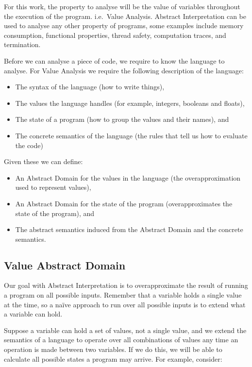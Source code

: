 For this work, the property to analyse will be the value of variables throughout the
execution of the program. i.e.~Value Analysis.  Abstract Interpretation can be used to
analyse any other property of programs, some examples include memory consumption,
functional properties, thread safety, computation traces, and termination.

Before we can analyse a piece of code, we require to know the language
to analyse. For Value Analysis we require the following description of
the language:

\begin{itemize}
\tightlist
\item
  The syntax of the language (how to write things),
\item
  The values the language handles (for example, integers, booleans and
  floats),
\item
  The state of a program (how to group the values and their names), and
\item
  The concrete semantics of the language (the rules that tell us how to
  evaluate the code)
\end{itemize}

Given these we can define:

\begin{itemize}
\tightlist
\item
  An Abstract Domain for the values in the language (the
  overapproximation used to represent values),
\item
  An Abstract Domain for the state of the program (overapproximates the
  state of the program), and
\item
  The abstract semantics induced from the Abstract Domain and the
  concrete semantics.
\end{itemize}

\subsection{Value Abstract Domain}\label{value-abstract-domain}

Our goal with Abstract Interpretation is to overapproximate the result
of running a program on all possible inputs. Remember that a variable
holds a single value at the time, so a naïve approach to run over all
possible inputs is to extend what a variable can hold.

Suppose a variable can hold a set of values, not a single value, and we
extend the semantics of a language to operate over all combinations of
values any time an operation is made between two variables. If we do
this, we will be able to calculate all possible states a program may
arrive. For example, consider:

